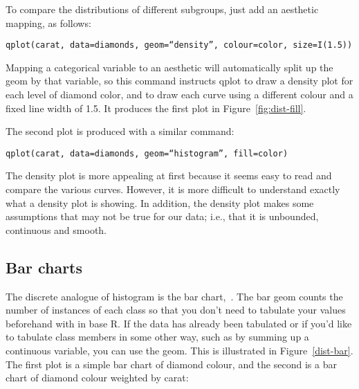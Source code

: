 To compare the distributions of different subgroups, just add an aesthetic mapping, as follows:

{\tt qplot(carat, data=diamonds, geom=``density'', colour=color, size=I(1.5))}

Mapping a categorical variable to an aesthetic will automatically split up the geom by that variable, so this command instructs qplot to draw a density plot for each level of diamond color, and to draw each curve using a different colour and a fixed line width of 1.5. It produces the first plot in Figure~\ref{fig:dist-fill}.

The second plot is produced with a similar command:

{\tt qplot(carat, data=diamonds, geom=``histogram'', fill=color)}

The density plot is more appealing at first because it seems easy to read and compare the various curves. However, it is more difficult to understand exactly what a density plot is showing.  In addition, the density plot makes some assumptions that may not be true for our data; i.e., that it is unbounded, continuous and smooth.

% 


\subsection{Bar charts}
\label{sub:bar}

The discrete analogue of histogram is the bar chart,~.  The bar geom counts the number of instances of each class so that you don't need to tabulate your values beforehand with  in base R.  If the data has already been tabulated or if you'd like to tabulate class members in some other way, such as by summing up a continuous variable, you can use the  geom. This is illustrated in Figure~\ref{dist-bar}.  The first plot is a simple bar chart of diamond colour, and the second is a bar chart of diamond colour weighted by carat:


